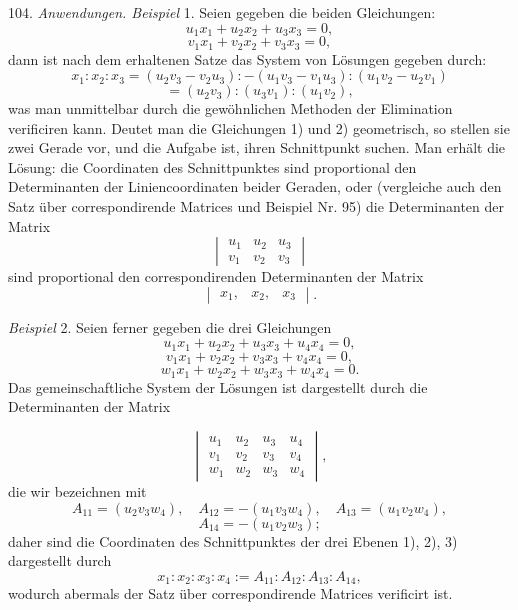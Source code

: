 \documentclass[11pt]{article}
\providecommand{\weberpage}[1]{}
\providecommand{\weq}[2]{\begin{equation}\tag{#1}#2\end{equation}}
\begin{document}
104. \textit{Anwendungen. Beispiel} 1. Seien gegeben die beiden Gleichungen:
\weq{1}{u_1x_1+u_2x_2+u_3x_3=0,}
\weq{2}{v_1x_1+v_2x_2+v_3x_3=0,}
dann ist nach dem erhaltenen Satze das System von Lösungen gegeben durch:
\[ x_1:x_2:x_3 = (u_2v_3-v_2u_3):-(u_1v_3-v_1u_3):(u_1v_2-u_2v_1) \]
\[ = (u_2v_3):(u_3v_1):(u_1v_2), \]
was man unmittelbar durch die gewöhnlichen Methoden der Elimination verificiren kann. Deutet man die Gleichungen 1) und 2) geometrisch, so stellen sie zwei Gerade vor, und die Aufgabe ist, ihren Schnittpunkt suchen. Man erhält die Lösung: die Coordinaten des Schnittpunktes sind proportional den Determinanten der Liniencoordinaten beider Geraden, oder (vergleiche auch den Satz über correspondirende Matrices und Beispiel Nr. 95) die Determinanten der Matrix
\[
\begin{vmatrix} u_1 & u_2 & u_3 \\ v_1 & v_2 & v_3 \end{vmatrix}
\]
sind proportional den correspondirenden Determinanten der Matrix
\[ \begin{vmatrix} x_1, & x_2, & x_3 \end{vmatrix}. \]

\textit{Beispiel} 2. Seien ferner gegeben die drei Gleichungen
\weq{1}{u_1x_1+u_2x_2+u_3x_3+u_4x_4=0,}
\weq{2}{v_1x_1+v_2x_2+v_3x_3+v_4x_4=0,}
\weq{3}{w_1x_1+w_2x_2+w_3x_3+w_4x_4=0.}
Das gemeinschaftliche System der Lösungen ist dargestellt durch die Determinanten der Matrix


\weberpage{109}
\[
\begin{vmatrix}
u_1 & u_2 & u_3 & u_4 \\
v_1 & v_2 & v_3 & v_4 \\
w_1 & w_2 & w_3 & w_4
\end{vmatrix},
\]
die wir bezeichnen mit
\[ A_{11}=(u_2v_3w_4), \quad A_{12}=-(u_1v_3w_4), \quad A_{13}=(u_1v_2w_4), \]
\[ A_{14}=-(u_1v_2w_3); \]
daher sind die Coordinaten des Schnittpunktes der drei Ebenen 1), 2), 3) dargestellt durch
\[ x_1:x_2:x_3:x_4:=A_{11}:A_{12}:A_{13}:A_{14}, \]
wodurch abermals der Satz über correspondirende Matrices verificirt ist.
\end{document}
